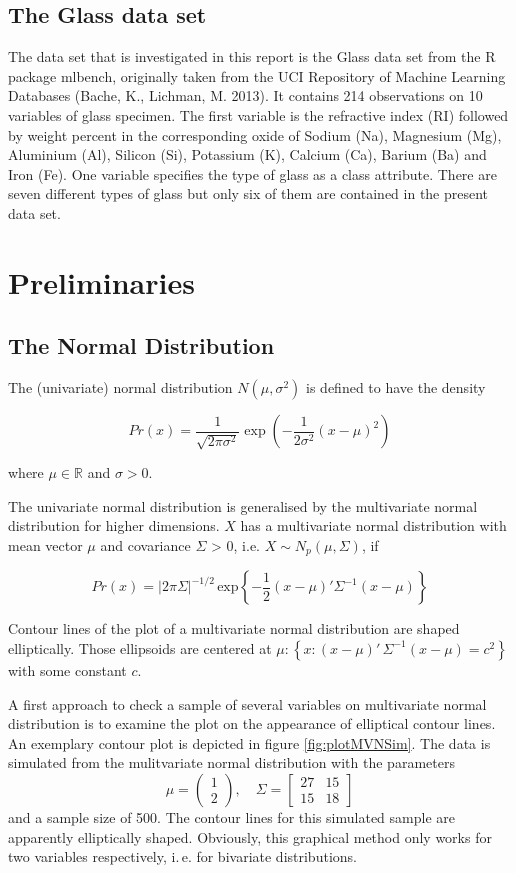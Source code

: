 \documentclass[a4paper, 12pt, titlepage, headsepline, listof = totoc, bibliography = totoc, numbers = noenddot]{scrartcl}
\newcommand{\ie}{i.\,e. }
\begin{document}
\subsection{The Glass data set}

The data set that is investigated in this report is the Glass data set from the R package mlbench, originally taken from the UCI Repository of Machine Learning Databases (Bache, K., Lichman, M. 2013). It contains 214 observations on 10 variables of glass specimen. The first variable is the refractive index (RI) followed by weight percent in the corresponding oxide of Sodium (Na), Magnesium (Mg), Aluminium (Al), Silicon (Si), Potassium (K), Calcium (Ca), Barium (Ba) and Iron (Fe). One variable specifies the type of glass as a class attribute. There are seven different types of glass but only six of them are contained in the present data set.

\newpage
\section{Preliminaries}\label{sec:preliminaries}

\subsection{The Normal Distribution}

The (univariate) normal distribution $N(\mu,\sigma^2)$ is defined to have the density

\[ Pr(x) = \frac{1}{\sqrt{2\pi\sigma^2}} \exp (-\frac{1}{2\sigma^2}(x - \mu)^2) \]

where $\mu \in \mathbb{R}$ and $\sigma > 0$.

The univariate normal distribution is generalised by the multivariate normal distribution for higher
dimensions. $X$ has a multivariate normal distribution with mean vector $\mu$ and covariance $\Sigma$ > 0, i.e. $X \sim N_p(\mu,\Sigma)$, if

\[Pr(x) = |2\pi\Sigma|^{-1/2} \,\mbox{exp}\left\{-\frac{1}{2}(x-\mu)' \Sigma^{-1}(x-\mu)\right\}\]

Contour lines of the plot of a multivariate normal distribution are shaped elliptically. Those ellipsoids are centered at $\mu : \left\{x:(x-\mu)'\, \Sigma^{-1}(x-\mu) = c^2\right\}$ with some constant $c$.

A first approach to check a sample of several variables on multivariate normal distribution is to examine the plot on the appearance of elliptical contour lines. An exemplary contour plot is depicted in figure \ref{fig:plotMVNSim}. The data is simulated from the mulitvariate normal distribution with the parameters
\[\mu = \left(\begin{array}{c} 1\\ 2\end{array} \right), \quad \Sigma = \left[\begin{array}{cc} 27 & 15\\ 15 & 18\end{array} \right]\]
and a sample size of 500. The contour lines for this simulated sample are apparently elliptically shaped. Obviously, this graphical method only works for two variables respectively, \ie for bivariate distributions.
\end{document}
